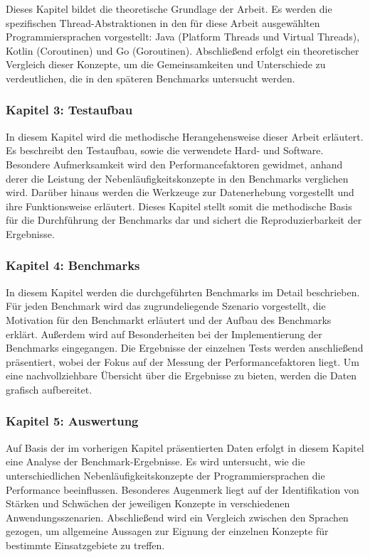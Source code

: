 \documentclass[fontsize=12pt,paper=a4,twoside=semi,parskip=half-,headsepline,headinclude]{scrreprt}
\begin{document}
Dieses Kapitel bildet die theoretische Grundlage der Arbeit. Es werden die spezifischen Thread-Abstraktionen in den für diese Arbeit ausgewählten Programmiersprachen vorgestellt: Java (Platform Threads und Virtual Threads), Kotlin (Coroutinen) und Go (Goroutinen). Abschließend erfolgt ein theoretischer Vergleich dieser Konzepte, um die Gemeinsamkeiten und Unterschiede zu verdeutlichen, die in den späteren Benchmarks untersucht werden.

\subsubsection{Kapitel 3: Testaufbau}

In diesem Kapitel wird die methodische Herangehensweise dieser Arbeit erläutert. Es beschreibt den Testaufbau, sowie die verwendete Hard- und Software. Besondere Aufmerksamkeit wird den Performancefaktoren gewidmet, anhand derer die Leistung der Nebenläufigkeitskonzepte in den Benchmarks verglichen wird. Darüber hinaus werden die Werkzeuge zur Datenerhebung vorgestellt und ihre Funktionsweise erläutert. Dieses Kapitel stellt somit die methodische Basis für die Durchführung der Benchmarks dar und sichert die Reproduzierbarkeit der Ergebnisse.

\subsubsection{Kapitel 4: Benchmarks}

In diesem Kapitel werden die durchgeführten Benchmarks im Detail beschrieben. Für jeden Benchmark wird das zugrundeliegende Szenario vorgestellt, die Motivation für den Benchmarkt erläutert und der Aufbau des Benchmarks erklärt. Außerdem wird auf Besonderheiten bei der Implementierung der Benchmarks eingegangen. Die Ergebnisse der einzelnen Tests werden anschließend präsentiert, wobei der Fokus auf der Messung der Performancefaktoren liegt. Um eine nachvollziehbare Übersicht über die Ergebnisse zu bieten, werden die Daten grafisch aufbereitet.

\subsubsection{Kapitel 5: Auswertung}

Auf Basis der im vorherigen Kapitel präsentierten Daten erfolgt in diesem Kapitel eine Analyse der Benchmark-Ergebnisse. Es wird untersucht, wie die unterschiedlichen Nebenläufigkeitskonzepte der Programmiersprachen die Performance beeinflussen. Besonderes Augenmerk liegt auf der Identifikation von Stärken und Schwächen der jeweiligen Konzepte in verschiedenen Anwendungsszenarien. Abschließend wird ein Vergleich zwischen den Sprachen gezogen, um allgemeine Aussagen zur Eignung der einzelnen Konzepte für bestimmte Einsatzgebiete zu treffen.
\end{document}
